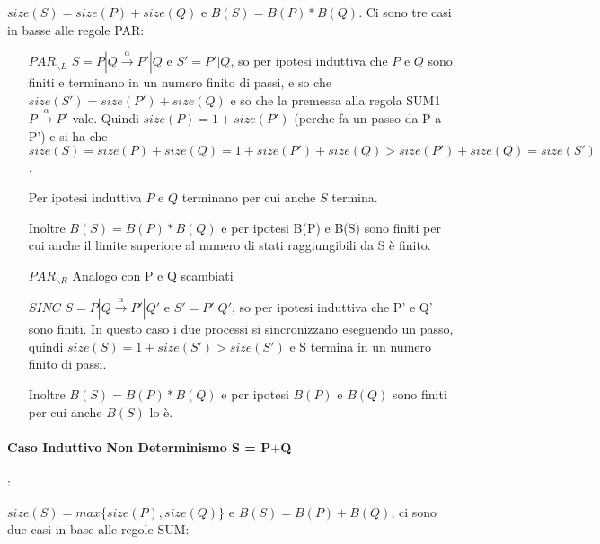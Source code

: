 \documentclass{article}
\begin{document}
$size(S) = size(P) + size(Q) $ e $B(S) = B(P) * B(Q)$. Ci sono tre casi in basse alle regole PAR:
\begin{itemize}
    \item[$PAR_{\backslash L}$] $S = P|Q \xrightarrow{\alpha} P'|Q$ e $S'=P'|Q$, so per ipotesi induttiva che $P$ e $Q$ sono finiti e terminano in un numero finito di passi, e so che $size(S') = size(P') + size(Q) $ e so che la premessa alla regola SUM1  $P\xrightarrow{\alpha} P'$ vale. Quindi $size(P) = 1 + size(P')$ (perche fa un passo da P a P') e si ha che $size(S) = size(P) + size(Q) = 1+size(P') + size(Q) > size(P') + size(Q) = size(S')$. 
    
    Per ipotesi induttiva $P$ e $Q$ terminano per cui anche $S$ termina.
    
    Inoltre $B(S) = B(P)*B(Q)$  e per ipotesi B(P) e B(S) sono finiti per cui anche il limite superiore al numero di stati raggiungibili da S è finito.
    
     \item[$PAR_{\backslash R}$] Analogo con P e Q scambiati
     
     \item[$SINC$] $S = P|Q \xrightarrow{\alpha} P'|Q'$ e $S'=P'|Q'$, so per ipotesi induttiva che P' e Q' sono finiti. In questo caso i due processi si sincronizzano eseguendo un passo, quindi $size(S) = 1 + size(S') > size(S')$ e S termina in un numero finito di passi. 
     
     Inoltre $B(S) = B(P) * B(Q)$ e per ipotesi $B(P)$ e $B(Q)$ sono finiti per cui anche $B(S)$ lo è.
\end{itemize}

\paragraph{Caso Induttivo Non Determinismo S = P$+$Q}:

$size(S) = max\{size(P), size(Q)\}$ e $B(S) = B(P) + B(Q)$, ci sono due casi in base alle regole SUM:
\end{document}
